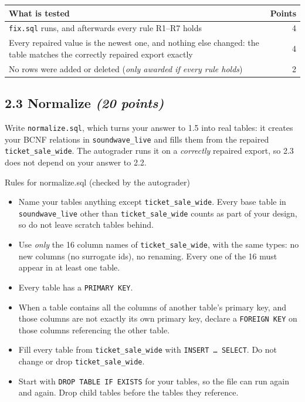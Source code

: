 \documentclass[11pt]{article}
\newcommand{\code}[1]{\texttt{#1}}
\newcommand{\pts}[1]{\hfill\textit{(#1 points)}}
\begin{document}
\begin{center}
\small
\begin{tabularx}{\linewidth}{@{}X r@{}}
\toprule
\textbf{What is tested} & \textbf{Points}\\
\midrule
\code{fix.sql} runs, and afterwards every rule R1--R7 holds & 4\\
Every repaired value is the newest one, and nothing else changed: the table matches the correctly repaired export exactly & 4\\
No rows were added or deleted (\emph{only awarded if every rule holds}) & 2\\
\bottomrule
\end{tabularx}
\end{center}

\subsection*{2.3 Normalize \pts{20}}

Write \code{normalize.sql}, which turns your answer to 1.5 into real tables:
it creates your BCNF relations in \code{soundwave\_live} and fills them from
the repaired \code{ticket\_sale\_wide}. The autograder runs it on a
\emph{correctly} repaired export, so 2.3 does not depend on your answer to 2.2.

\begin{warnbox}{Rules for normalize.sql (checked by the autograder)}
\begin{itemize}[nosep]
  \item Name your tables anything except \code{ticket\_sale\_wide}. Every base
  table in \code{soundwave\_live} other than \code{ticket\_sale\_wide} counts
  as part of your design, so do not leave scratch tables behind.
  \item Use \emph{only} the 16 column names of \code{ticket\_sale\_wide}, with
  the same types: no new columns (no surrogate ids), no renaming. Every one of
  the 16 must appear in at least one table.
  \item Every table has a \code{PRIMARY KEY}.
  \item When a table contains all the columns of another table's primary key,
  and those columns are not exactly its own primary key, declare a
  \code{FOREIGN KEY} on those columns referencing the other table.
  \item Fill every table from \code{ticket\_sale\_wide} with
  \code{INSERT \ldots\ SELECT}. Do not change or drop \code{ticket\_sale\_wide}.
  \item Start with \code{DROP TABLE IF EXISTS} for your tables, so the file can
  run again and again. Drop child tables before the tables they reference.
\end{itemize}
\end{warnbox}
\end{document}

